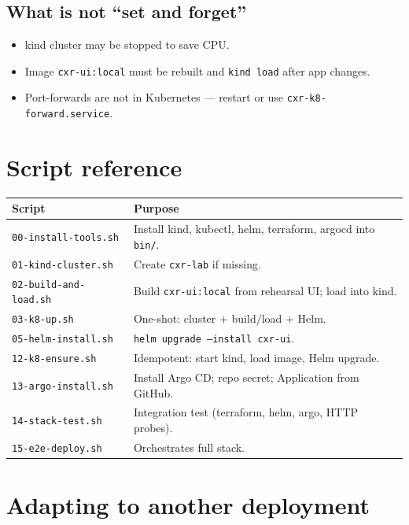 \documentclass[11pt,a4paper]{report}
\begin{document}
\section{What is not ``set and forget''}
\begin{itemize}
  \item kind cluster may be stopped to save CPU.
  \item Image \texttt{cxr-ui:local} must be rebuilt and \texttt{kind load} after app changes.
  \item Port-forwards are not in Kubernetes --- restart or use \texttt{cxr-k8-forward.service}.
\end{itemize}

\chapter{Script reference}

\begin{longtable}{@{}p{3.6cm}p{9.8cm}@{}}
\toprule
Script & Purpose \\
\midrule
\endhead
\texttt{00-install-tools.sh} & Install kind, kubectl, helm, terraform, argocd into \texttt{bin/}. \\
\texttt{01-kind-cluster.sh} & Create \texttt{cxr-lab} if missing. \\
\texttt{02-build-and-load.sh} & Build \texttt{cxr-ui:local} from rehearsal UI; load into kind. \\
\texttt{03-k8-up.sh} & One-shot: cluster + build/load + Helm. \\
\texttt{05-helm-install.sh} & \texttt{helm upgrade --install cxr-ui}. \\
\texttt{12-k8-ensure.sh} & Idempotent: start kind, load image, Helm upgrade. \\
\texttt{13-argo-install.sh} & Install Argo CD; repo secret; Application from GitHub. \\
\texttt{14-stack-test.sh} & Integration test (terraform, helm, argo, HTTP probes). \\
\texttt{15-e2e-deploy.sh} & Orchestrates full stack. \\
\bottomrule
\end{longtable}

\chapter{Adapting to another deployment}
\end{document}
